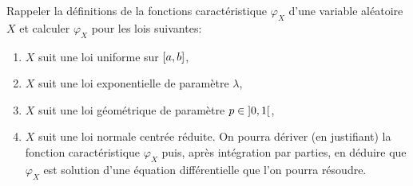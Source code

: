 \begin{td-exo}[] %
    Rappeler la définitions de la fonctions caractéristique
    \(\varphi_X\) d'une variable aléatoire \(X\) et 
    calculer \(\varphi_X\) pour les lois suivantes:
    \begin{enumerate}
        \item \(X\) suit une loi uniforme sur \(\mathopen{}\left[a,b\right]\mathclose{}\),
        \item \(X\) suit une loi exponentielle de paramètre \(\lambda\),
        \item \(X\) suit une loi géométrique de paramètre \(p\in\mathopen{}\left]0,1\right[\mathclose{}\),
        \item \(X\) suit une loi normale centrée réduite. On pourra
        dériver (en justifiant) la fonction caractéristique \(\varphi_X\)
        puis, après intégration par parties, en déduire que \(\varphi_X\)
        est solution d'une équation différentielle que l'on pourra résoudre.
    \end{enumerate}
\end{td-exo}
